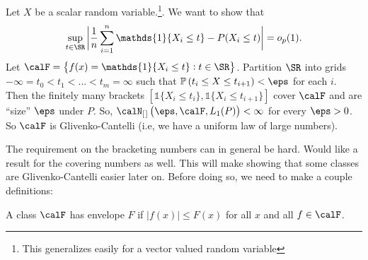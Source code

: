\begin{example*}
	Let \(X\) be a scalar random variable.\footnote{This generalizes easily for a vector valued random variable}. We want to show that 
	\[
		\sup_{t\in\SR}\bigg| \frac{1}{n}\sum_{i=1}^n \mathds{1}\{X_i\leq t\}-P(X_i\leq t)\bigg|=o_p(1)
	.\]
	Let \(\calF = \left\{f(x)=\mathds{1}\{X_i\leq t\}: t \in \SR\right\}\). Partition \(\SR\) into grids  \(-\infty = t_0 < t_1 < \dots< t_m = \infty\) such that \(\P\left(t_i \leq X \leq t_{i+1}\right)<\eps\) for each \(i\). Then the finitely many brackets \(\left[\mathds{1}\{X_i \leq t_i\},\mathds{1}\{X_i \leq t_{i+1}\}\right]\) cover \(\calF\) and are ``size'' \(\eps\) under \(P\). So, \(\calN_{[\hspace{0.1em}]}\left(\eps,\calF,L_1(P)\right)<\infty\) for every \(\eps>0\). So \(\calF\) is Glivenko-Cantelli (i.e, we have a uniform law of large numbers).
\end{example*}
The requirement on the bracketing numbers can in general be hard. Would like a result for the covering numbers as well. This will make showing that some classes are Glivenko-Cantelli easier later on. Before doing so, we need to make a couple definitions:
\begin{definition}[Envelope]
	\label{def:envelope}
	A class \(\calF\) has envelope \(F\) if \(|f(x)|\leq F(x)\) for all \(x\) and all \(f\in\calF\).
\end{definition}

